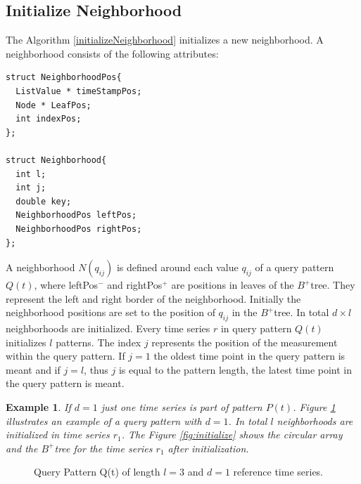 \documentclass[abstracton,12pt,oneside]{scrreprt}
\newtheorem{example}{Example}
\begin{document}
\subsection{Initialize Neighborhood}
The Algorithm \ref{initializeNeighborhood} initializes a new neighborhood. A neighborhood consists of the following attributes: 
\lstset{language=C}
\begin{lstlisting}
struct NeighborhoodPos{
  ListValue * timeStampPos;
  Node * LeafPos;
  int indexPos;
};

struct Neighborhood{
  int l;
  int j;
  double key;
  NeighborhoodPos leftPos;
  NeighborhoodPos rightPos;
};
\end{lstlisting}
\BlankLine
A neighborhood $N(q_{ij})$ is defined around each value $q_{ij}$ of a query pattern $Q(t)$, where leftPos$^-$ and rightPos$^+$ are positions in leaves of the $B^+$tree. They represent the left and right border of the neighborhood. Initially the neighborhood positions are set to the position of $q_{ij}$ in the $B^+$tree. In total $d \times l$ neighborhoods are initialized. Every time series $r$ in query pattern $Q(t)$ initializes $l$ patterns. The index $j$ represents the position of the measurement within the query pattern. If $j=1$ the oldest time point in the query pattern is meant and if $j=l$, thus $j$ is equal to the pattern length, the latest time point in the query pattern is meant. 



\begin{example}
	If $d=1$ just one time series is part of pattern $P(t)$. Figure \ref{Qpatt} illustrates an example of a query pattern with $d=1$. In total $l$ neighborhoods are initialized in time series $r_1$. The Figure \ref{fig:initialize} shows the circular array and the $B^+$tree for the time series $r_1$ after initialization.
\end{example}

\begin{figure}[H]
	\centering
	\caption{Query Pattern Q(t) of length $l=3$ and $d=1$ reference time series.}
	\label{Qpatt}
\end{figure}
\end{document}
